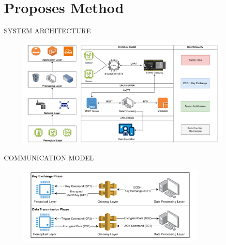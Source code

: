\section{Proposes Method}
\begin{frame}{SYSTEM ARCHITECTURE}
\vspace{-0.25cm} %
\begin{figure}
    \centering
    \includegraphics[width=0.97\textwidth]{pic/realsystem.pdf}
\end{figure}
\end{frame}

\begin{frame}{COMMUNICATION MODEL}
\vspace{-0.3cm}
\begin{figure}
    \centering
    \includegraphics[width=0.85\textwidth]{pic/system.pdf}
\end{figure}
\end{frame}

